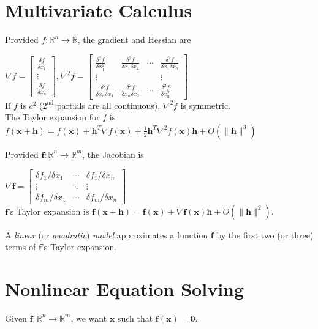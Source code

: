 \documentclass[landscape,10pt,letterpaper]{article}
\newcommand{\heading}[1]{\vspace{-1.5em} \section*{#1} \vspace{-1.0em}}
\begin{document}
\begin{multicols}{4}
\vspace{-1.0em}

\heading{Multivariate Calculus}

Provided $f : \mathbb{R}^n \to \mathbb{R}$, the gradient and Hessian are

$\nabla f = \left[ \begin{array}{c} \frac{\delta f}{\delta x_1} \\ \vdots \\ \frac{\delta f}{\delta x_n} \end{array} \right], \nabla^2 f = \left[ \begin{array}{cccc}  \frac{\delta^2 f}{\delta x_1^2} & \frac{\delta^2 f}{\delta x_1 \delta x_2} & \cdots & \frac{\delta^2 f}{\delta x_1 \delta x_n} \\
\vdots & & & \vdots \\
\frac{\delta^2 f}{\delta x_n \delta x_1} & \frac{\delta^2 f}{\delta x_n \delta x_2} & \cdots & \frac{\delta^2 f}{\delta x_n^2}
\end{array} \right]$ \\
If $f$ is $c^2$ ($2^{\mathrm{nd}}$ partials are all continuous), $\nabla^2 f$ is symmetric. \\
The Taylor expansion for $f$ is \\
$f(\mathbf{x} + \mathbf{h}) = f(\mathbf{x}) + \mathbf{h}^T \nabla f(\mathbf{x}) + \frac{1}{2} \mathbf{h}^T \nabla^2 f(\mathbf{x}) \mathbf{h} + O(\| \mathbf{h} \|^3)$

Provided $\mathbf{f} : \mathbb{R}^n \to \mathbb{R}^m$, the Jacobian is

$\nabla \mathbf{f} = \left[ \begin{array}{ccc} \delta f_1 / \delta x_1 & \cdots & \delta f_1 / \delta x_n \\ \vdots & \ddots & \vdots \\ \delta f_m / \delta x_1 & \cdots & \delta f_m / \delta x_n \end{array} \right]$ \\
$\mathbf{f}$'s Taylor expansion is 
$\mathbf{f}(\mathbf{x} + \mathbf{h}) = \mathbf{f}(\mathbf{x}) + \nabla \mathbf{f}(\mathbf{x})\mathbf{h} + O(\| \mathbf{h} \|^2)$.

A \emph{linear} (or \emph{quadratic}) \emph{model} approximates a function $\mathbf{f}$ by the first two (or three) terms of $\mathbf{f}$'s Taylor expansion.

\heading{Nonlinear Equation Solving}

Given $\mathbf{f} : \mathbb{R}^n \to \mathbb{R}^m$, we want $\mathbf{x}$ such that $\mathbf{f}(\mathbf{x}) = \mathbf{0}$.


\end{multicols}
\end{document}
